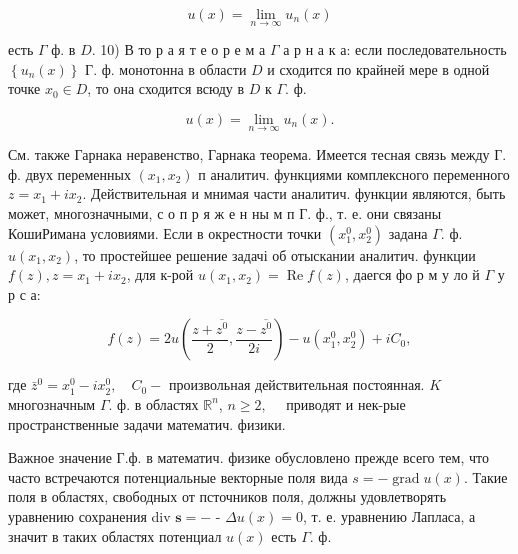 \documentclass[10pt]{article}
\begin{document}
\[

u(x)=\lim _{n \rightarrow \infty} u_{n}(x)

\]



есть $\Gamma$ ф. в $D$. 10) В то р а я т е о р е м а $\Gamma$ а р н а к а: если последовательность $\left\{u_{n}(x)\right\}$ Г. ф. монотонна в области $D$ и сходится по крайней мере в одной точке $x_{0} \in D$, то она сходится всюду в $D$ к $\Gamma$. ф.



\[

u(x)=\lim _{n \rightarrow \infty} u_{n}(x) .

\]



См. также Гарнака неравенство, Гарнака теорема. Имеется тесная связь между $Г$. ф. двух переменных $\left(x_{1}, x_{2}\right)$ п аналитич. функциями комплексного переменного $z=x_{1}+i x_{2}$. Действительная и мнимая части аналитич. функции являются, быть может, многозначными, с о п р я ж е н ны м п Г. ф., т. е. они связаны КошиРимана условиями. Если в окрестности точки $\left(x_{1}^{0}, x_{2}^{0}\right)$ задана $\Gamma$. ф. $u\left(x_{1}, x_{2}\right)$, то простейшее решение задачі об отыскании аналитич. функции $f(z), z=x_{1}+i x_{2}$, для к-рой $u\left(x_{1}, x_{2}\right)=\operatorname{Re} f(z)$, даегся фо р м у ло й $\Gamma$ у р с а:



\[

f(z)=2 u\left(\frac{z+\overline{z^{0}}}{2}, \frac{z-\overline{z^{0}}}{2 i}\right)-u\left(x_{1}^{0}, x_{2}^{0}\right)+i C_{0},

\]



где $\bar{z}^{0}=x_{1}^{0}-i x_{2}^{0}, \quad C_{0}-$ произвольная действительная постоянная. $K$ многозначным $\Gamma$. ф. в областях $\mathbb{R}^{n}$, $n \geqslant 2, \quad$ приводят и нек-рые пространственные задачи математич. физики.



Важное значение Г.ф. в математич. физике обусловлено прежде всего тем, что часто встречаются потенциальные векторные поля вида $s=-\operatorname{grad} u(x)$. Такие поля в областях, свободных от псточников поля, должны удовлетворять уравнению сохранения div $\boldsymbol{s}=-$ - $\Delta u(x)=0$, т. е. уравнению Лапласа, а значит в таких областях потенциал $u(x)$ есть $\Gamma$. ф.
\end{document}
